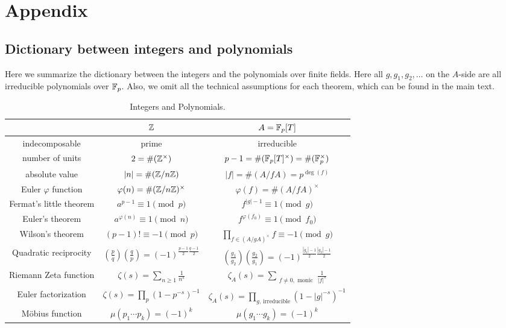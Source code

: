 \appendix
\section{Appendix}


\subsection{Dictionary between integers and polynomials}
\label{subsec:dictionary}

Here we summarize the dictionary between the integers and the polynomials over finite fields.
Here all $g, g_1, g_2, \dots$ on the $A$-side are all irreducible polynomials over $\mathbb{F}_p$.
Also, we omit all the technical assumptions for each theorem, which can be found in the main text.

\begin{table}[h]
    \begin{center}
        \begin{tabular}{c|c|c}
            \toprule
            & $\mathbb{Z}$ & $A = \mathbb{F}_p[T]$ \\
            \midrule
            indecomposable & prime & irreducible \\
            number of units &$2 = \#(\mathbb{Z}^\times)$ & $p - 1 = \# (\mathbb{F}_p[T]^\times) = \# (\mathbb{F}_p^\times)$ \\
            absolute value & $|n| = \# (\mathbb{Z} / n\mathbb{Z})$ & $|f| = \# (A / f A) = p^{\deg (f)}$ \\
            Euler $\varphi$ function & $\varphi(n) = \# (\mathbb{Z} / n \mathbb{Z})^\times$ & $\varphi(f) = \# (A / fA)^\times$ \\
            Fermat's little theorem & $a^{p-1} \equiv 1 \pmod{p}$ & $f^{|g| - 1} \equiv 1 \pmod{g}$ \\
            Euler's theorem & $a^{\varphi(n)} \equiv 1 \pmod{n}$ & $f^{\varphi(f_0)} \equiv 1 \pmod{f_0}$ \\
            Wilson's theorem & $(p-1)! \equiv -1 \pmod{p}$ & $\prod_{f \in (A / g A)^\times} f \equiv -1 \pmod{g}$ \\
            Quadratic reciprocity & $\left(\frac{p}{q}\right)\left(\frac{q}{p}\right) = (-1)^{\frac{p-1}{2}\frac{q-1}{2}}$ & $\left(\frac{g_1}{g_2}\right)\left(\frac{g_2}{g_1}\right) = (-1)^{\frac{|g_1| - 1}{2}\frac{|g_2| - 1}{2}}$\\
            Riemann Zeta function & $\zeta(s) = \sum_{n \ge 1}\frac{1}{n^s}$ & $\zeta_{A}(s) = \sum_{\substack{f \ne 0, \text{ monic}}} \frac{1}{|f|^s}$ \\
            Euler factorization & $\zeta(s) = \prod_{p} (1 - p^{-s})^{-1}$ & $\zeta_A(s) = \prod_{g,\,\text{irreducible}} (1 - |g|^{-s})^{-1}$ \\
            M\"obius function & $\mu(p_1 \cdots p_k) = (-1)^k$ & $\mu(g_1 \cdots g_k) = (-1)^k$ \\
            \bottomrule
        \end{tabular}
        \caption{Integers and Polynomials.}
        \label{tab:dictionary}
    \end{center}
\end{table}

